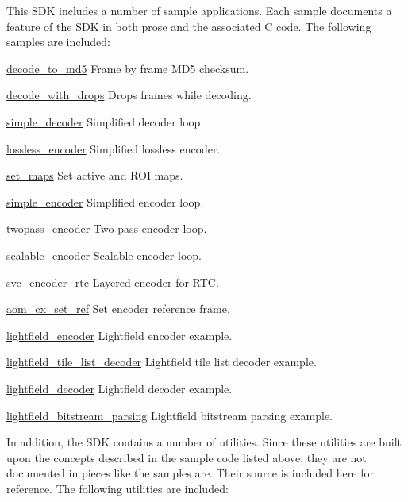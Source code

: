 This S\+DK includes a number of sample applications. Each sample documents a feature of the S\+DK in both prose and the associated C code. The following samples are included\+:


\begin{DoxyItemize}
\item \hyperlink{example_decode_to_md5}{decode\+\_\+to\+\_\+md5} Frame by frame M\+D5 checksum.
\item \hyperlink{example_decode_with_drops}{decode\+\_\+with\+\_\+drops} Drops frames while decoding.
\item \hyperlink{example_simple_decoder}{simple\+\_\+decoder} Simplified decoder loop.
\item \hyperlink{example_lossless_encoder}{lossless\+\_\+encoder} Simplified lossless encoder.
\item \hyperlink{example_set_maps}{set\+\_\+maps} Set active and R\+OI maps.
\item \hyperlink{example_simple_encoder}{simple\+\_\+encoder} Simplified encoder loop.
\item \hyperlink{example_twopass_encoder}{twopass\+\_\+encoder} Two-\/pass encoder loop.
\item \hyperlink{example_scalable_encoder}{scalable\+\_\+encoder} Scalable encoder loop.
\item \hyperlink{example_svc_encoder_rtc}{svc\+\_\+encoder\+\_\+rtc} Layered encoder for R\+TC.
\item \hyperlink{example_aom_cx_set_ref}{aom\+\_\+cx\+\_\+set\+\_\+ref} Set encoder reference frame.
\item \hyperlink{example_lightfield_encoder}{lightfield\+\_\+encoder} Lightfield encoder example.
\item \hyperlink{example_lightfield_tile_list_decoder}{lightfield\+\_\+tile\+\_\+list\+\_\+decoder} Lightfield tile list decoder example.
\item \hyperlink{example_lightfield_decoder}{lightfield\+\_\+decoder} Lightfield decoder example.
\item \hyperlink{example_lightfield_bitstream_parsing}{lightfield\+\_\+bitstream\+\_\+parsing} Lightfield bitstream parsing example.
\end{DoxyItemize}

In addition, the S\+DK contains a number of utilities. Since these utilities are built upon the concepts described in the sample code listed above, they are not documented in pieces like the samples are. Their source is included here for reference. The following utilities are included\+:


